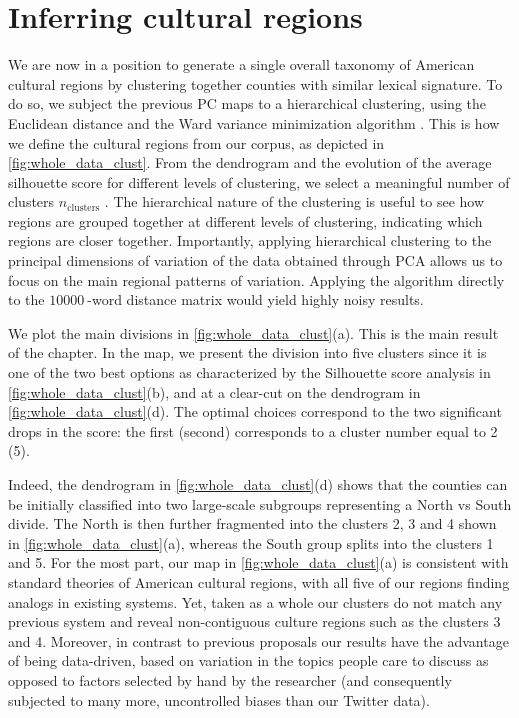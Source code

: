 \documentclass[../thesis.tex]{subfiles}
\begin{document}
\section{Inferring cultural regions}
We are now in a position to generate a single overall taxonomy of American cultural
regions by clustering together counties with similar lexical signature. To do so, we
subject the previous \ac{PC} maps to a hierarchical clustering, using the Euclidean
distance and the Ward variance minimization algorithm \cite{EverittClusterAnalysis2011}.
This is how we define the cultural regions from our corpus, as depicted in
\cref{fig:whole_data_clust}. From the dendrogram and the evolution of the average
silhouette score for different levels of clustering, we select a meaningful number of
clusters $n_{\text{clusters}}$ \cite{RousseeuwSilhouettesGraphical1987}. The
hierarchical nature of the clustering is useful to see how regions are grouped together
at different levels of clustering, indicating which regions are closer together.
Importantly, applying hierarchical clustering to the principal dimensions of variation
of the data obtained through \ac{PCA} allows us to focus on the main regional
patterns of variation. Applying the algorithm directly to the $\SI{10000}{}$-word
distance matrix would yield highly noisy results.

We plot the main divisions in \cref{fig:whole_data_clust}(a). This is the main result of
the chapter. In the map, we present the division into five clusters since it is one of the
two best options as characterized by the Silhouette score analysis in
\cref{fig:whole_data_clust}(b), and at a clear-cut on the dendrogram in
\cref{fig:whole_data_clust}(d). The optimal choices correspond to the two significant
drops in the score: the first (second) corresponds to a cluster number equal to 2 (5). 

Indeed, the dendrogram in \cref{fig:whole_data_clust}(d) shows that the counties can be
initially classified into two large-scale subgroups representing a North vs South
divide. The North is then further fragmented into the clusters 2, 3 and 4 shown in
\cref{fig:whole_data_clust}(a), whereas the South group splits into the clusters 1 and
5. For the most part, our map in \cref{fig:whole_data_clust}(a) is consistent with
standard theories of American cultural regions, with all five of our regions finding
analogs in existing systems. Yet, taken as a whole our clusters do not match any
previous system and reveal non-contiguous culture regions such as the clusters 3 and 4.
Moreover, in contrast to previous proposals our results have the advantage of being
data-driven, based on variation in the topics people care to discuss as opposed to
factors selected by hand by the researcher (and consequently subjected to many more,
uncontrolled biases than our Twitter data).
\end{document}
